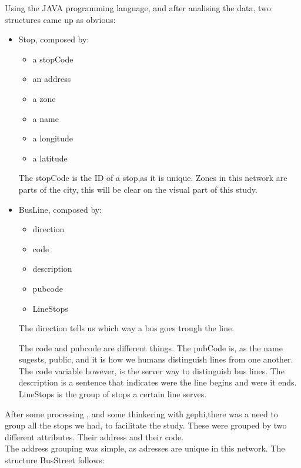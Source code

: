 \documentclass[12pt]{report}
\begin{document}
Using the JAVA programming language, and after analising the data, two structures came up as obvious:
\begin{itemize}
\item Stop, composed by:
	\begin{itemize}
	\item a stopCode
	\item an address
	\item a zone
	\item a name
	\item a longitude
	\item a latitude
	\end{itemize}
	The stopCode is the ID of a stop,as it is unique.
	Zones in this network are parts of the city, this will be clear on the visual part 		of this study.
	
\item BusLine, composed by:
	\begin{itemize}
	\item direction
	\item code
	\item description
	\item pubcode
	\item LineStops
	\end{itemize}
	

	The direction tells us which way a bus goes trough the line.

	The code and pubcode are different things. The pubCode is, as the name sugests, 			public, and it is how we humans distinguish lines from one another. 
	The code variable however, is the server way to distinguish bus lines.
	The description is a sentence that indicates were the line begins and were it ends.
	LineStops is the group of stops a certain line serves.
	
\end{itemize}
	After some processing , and some thinkering with gephi,there was a need to group all the stops we had, to facilitate the study. These were grouped by two different attributes. Their address and their code. \\
	
The address grouping was simple, as adresses are unique in this network. The structure BusStreet follows:	
	
\end{document}
